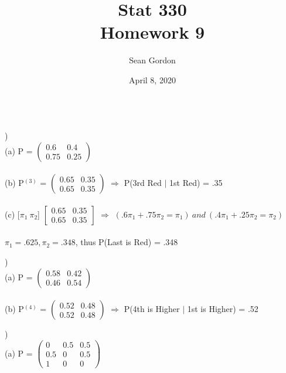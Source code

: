 \documentclass[12pt]{article}
\title{Stat 330\\Homework 9}
\author{Sean Gordon}
\date{April 8, 2020}
\begin{document}
\maketitle


\noindent\hrulefill \\[-.8em]


)\\
\indent (a) P = 
$\begin{pmatrix}
0.6 & 0.4\\
0.75 & 0.25
\end{pmatrix}$\\\\

\indent (b) 
P$^{(3)}$ = 
$\begin{pmatrix}
0.65 & 0.35\\
0.65 & 0.35
\end{pmatrix}$ $\Rightarrow$ P(3rd Red $|$ 1st Red) = .35\\\\


\indent (c) [$\pi_1 \ \pi_2$]
$\begin{bmatrix}
0.65 & 0.35\\
0.65 & 0.35
\end{bmatrix}$ $\Rightarrow$ $(.6\pi_1 + .75\pi_2 = \pi_1)\ and\ (.4\pi_1 + .25\pi_2 = \pi_2)$\\\\
\indent \indent $\pi_1 = .625, \pi_2 = .348$, thus P(Last is Red) = .348\\


\noindent \hrulefill 


)\\
\indent (a) P = 
$\begin{pmatrix}
0.58 & 0.42\\
0.46 & 0.54
\end{pmatrix}$\\\\

\indent (b) P$^{(4)}$ = 
$\begin{pmatrix}
0.52 & 0.48\\
0.52 & 0.48
\end{pmatrix}$ $\Rightarrow$ P(4th is Higher $|$ 1st is Higher) = .52\\


\noindent \hrulefill 


)\\
\indent (a) P = 
$\begin{pmatrix}
0 & 0.5 & 0.5\\
0.5 & 0 & 0.5\\
1 & 0 & 0
\end{pmatrix}$\\\\
\end{document}
